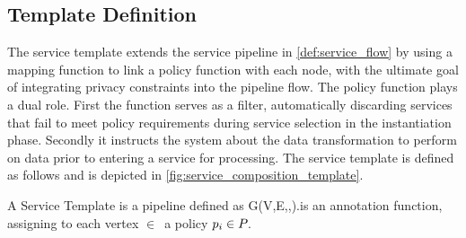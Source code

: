 \subsection{Template Definition}
The service template extends the service pipeline in \cref{def:service_flow} by using a mapping function to link a policy function with each node,
with the ultimate goal of integrating privacy constraints into the pipeline flow.
The policy function plays a dual role.
First the function serves as a filter, automatically discarding services that fail to meet policy requirements during service selection in the instantiation phase. Secondly
it instructs the system about the data transformation to perform on data prior to entering a service for processing.
The service template is defined as follows and is depicted in \cref{fig:service_composition_template}.



\begin{definition} \label{def:pipeline}
  A Service Template is a pipeline defined as G(V,E,\myLambda,\myGamma).\myGamma is an annotation function, assigning to each vertex $\in$\V\ a policy $p_i\in P_{}$.

\end{definition}



